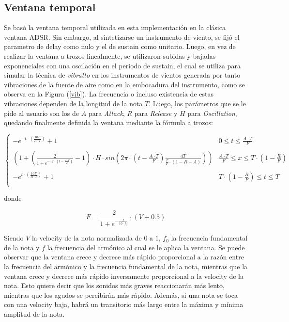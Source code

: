 \subsection{Ventana temporal}

Se basó la ventana temporal utilizada en esta implementación en la clásica ventana ADSR. Sin embargo, al sintetizarse un instrumento de viento, se fijó el parametro de delay como nulo y el de sustain como unitario. Luego, en vez de realizar la ventana a trozos linealmente, se utilizaron subidas y bajadas exponenciales con una oscilación en el periodo de sustain, el cual se utiliza para simular la técnica de \textit{vibratto} en los instrumentos de vientos generada por tanto vibraciones de la fuente de aire como en la embocadura del instrumento, como se observa en la Figura (\ref{vib}). La frecuencia o incluso existencia de estas vibraciones dependen de la longitud de la nota $T$. Luego, los parámetros que se le pide al usuario son los de $A$ para \textit{Attack}, $R$ para \textit{Release} y $H$ para \textit{Oscillation}, quedando finalmente definida la ventana mediante la fórmula a trozos:

\begin{equation}
   \left\{
\begin{array}{ll}
      -e^{-t \cdot \left( \frac{10F}{A\cdot T} \right) } + 1 & 0\leq t \leq \frac{A \cdot T}{F} \\
      \\
     \left( 1 + \left( \frac{2}{1 + e ^{-\cdot T \cdot \left( t - \frac{A \cdot T}{F} \right) }} - 1 \right) \cdot H \cdot sin\left( 2\pi \cdot \left( t - \frac{A \cdot T}{F} \right) \frac{4T}{\frac{T}{F} \cdot \left( 1 - R - A \right)} \right) \right) & \frac{A \cdot T}{F} \leq x \leq T\cdot (1-\frac{R}{F}) \\
      \\
      -e^{t \cdot \left( \frac{10F}{R\cdot T} \right) } + 1 & T\cdot (1-\frac{R}{F}) \leq t \leq T \\
\end{array} 
\right. 
\end{equation}

donde

\begin{equation}
F = \frac{2}{1 + e^{-\frac{f}{10\cdot f_0}}} \cdot \left( V + 0.5 \right)
\end{equation}

Siendo $V$ la velocity de la nota normalizada de $0$ a $1$, $f_0$ la frecuencia fundamental de la nota y $f$ la frecuencia del armónico al cual se le aplica la ventana. Se puede observar que la ventana crece y decrece más rápido proporcional a la razón entre la frecuencia del armónico y la frecuencia fundamental de la nota, mientras que la ventana crece y decrece más rápido inversamente proporcional a la velocity de la nota. Esto quiere decir que los sonidos más graves reaccionarán más lento, mientras que los agudos se percibirán más rápido. Además, si una nota se toca con una velocity baja, habrá un transitorio más largo entre la máxima y mínima amplitud de la nota.

